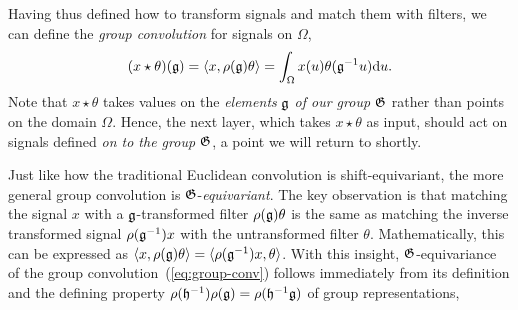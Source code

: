 Having thus defined how to transform signals and match them with filters, we can define the {\em group convolution} for signals on $\Omega$, 
\begin{equation}
    \label{eq:group-conv}
    (x \star \theta)(\fg) = \langle x, \rho(\fg) \theta \rangle = \int_\Omega x(u) \theta(\fg^{-1} u) \mathrm{d}u. %
\end{equation}
%
Note that $x \star \theta$ takes values on the {\em elements} ${\mathfrak{g}}$ {\em of our group} ${\mathfrak{G}}$ rather than points on the domain $\Omega$.
Hence, the next layer, which takes $x \star \theta$ as input, should 
act on signals defined %
{\em on to the group} ${\mathfrak{G}}$, %
a point we will return to shortly.

Just like how the traditional Euclidean convolution is shift-equivariant, 
the more general group convolution is ${\mathfrak{G}}$-{\em equivariant}. 
The key observation is that matching the signal $x$ with a ${\mathfrak{g}}$-transformed filter $\rho({\mathfrak{g}}) \theta$ is the same as matching the inverse transformed signal $\rho({\mathfrak{g}}^{-1}) x$ with the untransformed filter $\theta$.
Mathematically, this can be expressed as $\langle x, \rho({\mathfrak{g}}) \theta \rangle = \langle \rho({\mathfrak{g}}^{-1}) x, \theta \rangle$.
%
%
With this insight, ${\mathfrak{G}}$-equivariance of the group convolution~(\ref{eq:group-conv}) follows immediately from its definition and the defining property $\rho({\mathfrak{h}}^{-1}) \rho({\mathfrak{g}}) = \rho({\mathfrak{h}}^{-1} {\mathfrak{g}})$ of group representations, 
